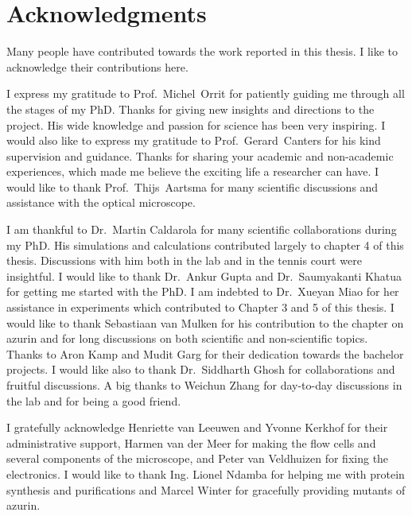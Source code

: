 \chapter*{Acknowledgments}
\label{ch:Acknowledgments}

Many people have contributed towards the work reported in this thesis.
I like to acknowledge their contributions here.

I express my gratitude to Prof.~Michel~Orrit for patiently guiding me through all the stages of my PhD.
Thanks for giving new insights and directions to the project.
His wide knowledge and passion for science has been very inspiring.
I would also like to express my gratitude to Prof.~Gerard~Canters for his kind supervision and guidance.
Thanks for sharing your academic and non-academic experiences, which made me believe the exciting life a researcher can have.
I would like to thank Prof.~Thijs~Aartsma for many scientific discussions and assistance with the optical microscope.

I am thankful to Dr.~Martin Caldarola for many scientific collaborations during my PhD.
His simulations and calculations contributed largely to chapter 4 of this thesis.
Discussions with him both in the lab and in the tennis court were insightful.
I would like to thank Dr.~Ankur Gupta and Dr.~Saumyakanti Khatua for getting me started with the PhD.
I am indebted to Dr.~Xueyan Miao for her assistance in experiments which contributed to Chapter 3 and 5 of this thesis.
I would like to thank Sebastiaan van Mulken for his contribution to the chapter on azurin and for long discussions on both scientific and non-scientific topics.
Thanks to Aron Kamp and Mudit Garg for their dedication towards the bachelor projects.
I would like also to thank Dr.~Siddharth Ghosh for collaborations and fruitful discussions.
A big thanks to Weichun Zhang for day-to-day discussions in the lab and for being a good friend. 

I gratefully acknowledge Henriette van Leeuwen and Yvonne Kerkhof for their administrative support, Harmen van der Meer for making the flow cells and several components of the microscope, and Peter van Veldhuizen for fixing the electronics.
I would like to thank Ing. Lionel Ndamba for helping me with protein synthesis and purifications and Marcel Winter for gracefully providing mutants of azurin. 

